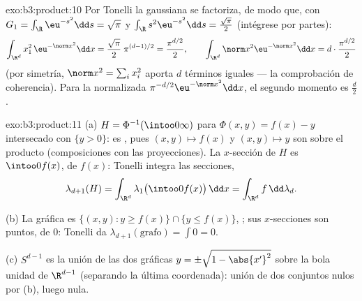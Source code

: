 \begin{solution}{exo:b3:product:10}
Por Tonelli la gaussiana se factoriza, de modo que, con $G_1 =
\int_\R\eu^{-s^2}\dd s = \sqrt\pi$ y $\int_\R
s^2\eu^{-s^2}\dd s = \frac{\sqrt\pi}2$ (intégrese por partes):
\[
\int_{\R^d}x_1^2\,\eu^{-\norm x^2}\dd x =
\frac{\sqrt\pi}2\;\pi^{(d-1)/2} = \frac{\pi^{d/2}}2,
\qquad
\int_{\R^d}\norm x^2\eu^{-\norm x^2}\dd x =
d\cdot\frac{\pi^{d/2}}2
\]
(por simetría, $\norm x^2 = \sum_ix_i^2$ aporta $d$ términos iguales ---
la comprobación de coherencia). Para la
 normalizada
$\pi^{-d/2}\eu^{-\norm x^2}\dd x$, el segundo momento es
$\frac d2$.
\end{solution}

\begin{solution}{exo:b3:product:11}
(a) $H = \Phi^{-1}(\intoo0\infty)$ para $\Phi(x, y) = f(x) -
y$ intersecado con $\{y > 0\}$: es
, pues $(x, y)
\mapsto f(x)$ y $(x,y)\mapsto y$ son
 sobre el producto
(composiciones con las proyecciones). La $x$-sección de $H$ es
$\intoo0{f(x)}$, de  $f(x)$:
Tonelli integra las secciones,
\[
\lambda_{d+1}(H) = \int_{\R^d}\lambda_1\bigl(\intoo0{f(x)}
\bigr)\,\dd x = \int_{\R^d}f\,\dd\lambda_d .
\]

(b) La gráfica es $\{(x,y) : y \geq f(x)\} \cap \{y \leq
f(x)\}$, ; sus $x$-secciones
son puntos, de  $0$: Tonelli da
$\lambda_{d+1}(\text{grafo}) =
\int 0 = 0$.

(c) $S^{d-1}$ es la unión de las dos gráficas $y =
\pm\sqrt{1 - \abs{x'}^2}$ sobre la bola unidad de $\R^{d-1}$ (separando
la última coordenada): unión de dos conjuntos nulos por (b), luego nula.
\end{solution}


